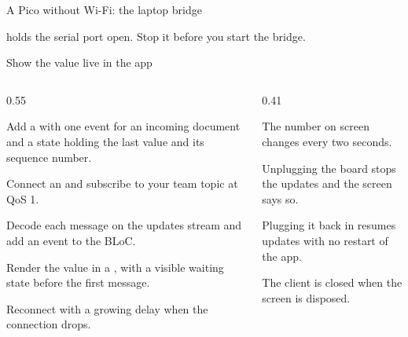 \documentclass[10pt,aspectratio=169,t]{beamer}
\begin{document}
\begin{frame}[embedded,fragile,eyebrow=Task II]{A Pico without Wi-Fi: the laptop bridge}
  \vskip 1mm
  \vskip 3mm
  \vskip 2mm
  \begin{warning}
     holds the serial port open. Stop it before you start the bridge.
  \end{warning}
\end{frame}

\begin{frame}[eyebrow=Task III]{Show the value live in the app}
  \begin{columns}[T]
    \begin{column}{0.55\textwidth}
      \begin{steps}
        \item Add a  with one event for an incoming document and a state holding the last value and its sequence number.
        \item Connect an  and subscribe to your team topic at QoS 1.
        \item Decode each message on the updates stream and add an event to the BLoC.
        \item Render the value in a , with a visible waiting state before the first message.
        \item Reconnect with a growing delay when the connection drops.
      \end{steps}
    \end{column}
    \begin{column}{0.41\textwidth}
      \begin{checklist}
        \item The number on screen changes every two seconds.
        \item Unplugging the board stops the updates and the screen says so.
        \item Plugging it back in resumes updates with no restart of the app.
        \item The client is closed when the screen is disposed.
      \end{checklist}
    \end{column}
  \end{columns}
\end{frame}
\end{document}
